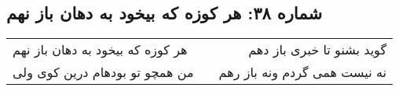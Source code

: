 \begin{center}
\section*{شماره ۳۸: هر کوزه که بیخود به دهان باز نهم}
\label{sec:038}
\begin{longtable}{l p{0.5cm} r}
هر کوزه که بیخود به دهان باز نهم
&&
گوید بشنو تا خبری باز دهم
\\
من همچو تو بودهام درین کوی ولی
&&
نه نیست همی گردم ونه باز رهم
\\
\end{longtable}
\end{center}
